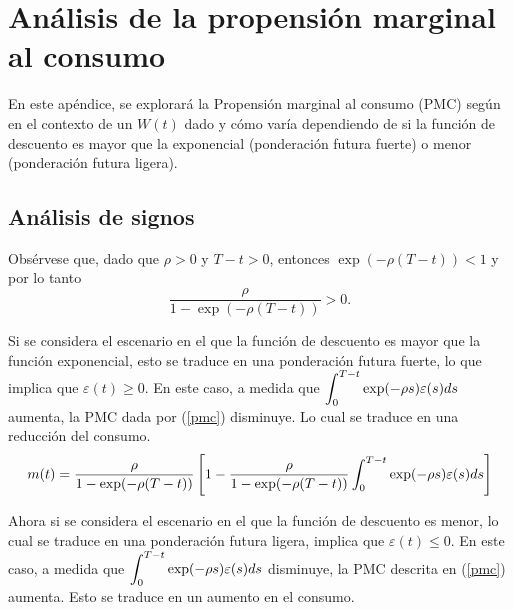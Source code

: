 \chapter{Análisis de la propensión marginal al consumo}\label{Apendice_D}

En este apéndice, se explorará la Propensión marginal al consumo (PMC) según \parencite{feigenbaum2021deviation} en el contexto de un $W(t)$ dado y cómo varía dependiendo de si la función de descuento es mayor que la exponencial (ponderación futura fuerte) o menor (ponderación futura ligera). 

\section{Análisis de signos}
Obsérvese que, dado que $\rho>0$ y $T-t > 0$, entonces $\exp (-\rho (T-t))<1$ y por lo tanto
$$\dfrac{\rho}{1 - \exp (-\rho (T-t))}>0.$$

Si se considera el escenario en el que la función de descuento es mayor que la función exponencial, esto se traduce en una ponderación futura fuerte, lo que implica que $\varepsilon(t) \geq 0$. En este caso, a medida que $\displaystyle \int_0^{T-t} \exp (- \rho s) \varepsilon(s) ds$ aumenta, la PMC dada por (\ref{pmc}) disminuye. Lo cual se traduce en una reducción del consumo.
\begin{equation}
\label{pmc}    
m(t)=\dfrac{\rho}{1 - \exp (-\rho (T-t))}  \left[ 1 - \dfrac{\rho}{1 - \exp (-\rho (T-t))}\displaystyle  \int_0^{T-t} \exp (- \rho s) \varepsilon(s) ds \right]\end{equation}


Ahora si se considera el escenario en el que la función de descuento es menor, lo cual se traduce en una ponderación futura ligera, implica que $\varepsilon(t)\leq 0$. En este caso, a medida que $\displaystyle \int_0^{T-t} \exp (- \rho s) \varepsilon(s) ds$ disminuye, la PMC descrita en (\ref{pmc}) aumenta. Esto se traduce en un aumento en el consumo.